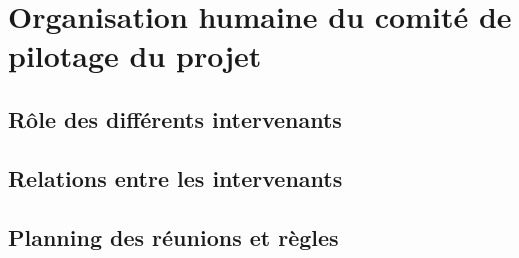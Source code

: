 
\section{Organisation humaine du comité de pilotage du projet}

    \subsection{Rôle des différents intervenants}

    \subsection{Relations entre les intervenants}

    \subsection{Planning des réunions et règles}
